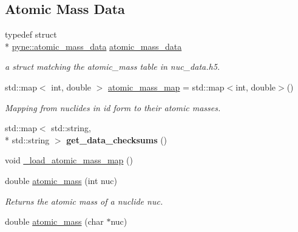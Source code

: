\subsection*{Atomic Mass Data}
\begin{DoxyCompactItemize}
\item 
\hypertarget{namespacepyne_a4d33f77321c43a895b32c56b0c4b9256}{typedef struct \\*
\hyperlink{structpyne_1_1atomic__mass__data}{pyne\-::atomic\-\_\-mass\-\_\-data} \hyperlink{namespacepyne_a4d33f77321c43a895b32c56b0c4b9256}{atomic\-\_\-mass\-\_\-data}}\label{namespacepyne_a4d33f77321c43a895b32c56b0c4b9256}

\begin{DoxyCompactList}\small\item\em a struct matching the atomic\-\_\-mass table in nuc\-\_\-data.\-h5. \end{DoxyCompactList}\item 
\hypertarget{namespacepyne_ad57b70e4dd814b1efc458ff58641bcef}{std\-::map$<$ int, double $>$ \hyperlink{namespacepyne_ad57b70e4dd814b1efc458ff58641bcef}{atomic\-\_\-mass\-\_\-map} = std\-::map$<$int, double$>$()}\label{namespacepyne_ad57b70e4dd814b1efc458ff58641bcef}

\begin{DoxyCompactList}\small\item\em Mapping from nuclides in id form to their atomic masses. \end{DoxyCompactList}\item 
\hypertarget{namespacepyne_a7ffac869653ccaac71a565704630ae43}{std\-::map$<$ std\-::string, \\*
std\-::string $>$ {\bfseries get\-\_\-data\-\_\-checksums} ()}\label{namespacepyne_a7ffac869653ccaac71a565704630ae43}

\item 
void \hyperlink{namespacepyne_afc84ecca5a23b416bd3bf42b0756e68e}{\-\_\-load\-\_\-atomic\-\_\-mass\-\_\-map} ()
\item 
double \hyperlink{namespacepyne_aaab79c2417fc60c1a248dd702403befb}{atomic\-\_\-mass} (int nuc)
\begin{DoxyCompactList}\small\item\em Returns the atomic mass of a nuclide {\itshape nuc}. \end{DoxyCompactList}\item 
\hypertarget{namespacepyne_a070a35bbdb0217ff8c4b222572912f87}{double \hyperlink{namespacepyne_a070a35bbdb0217ff8c4b222572912f87}{atomic\-\_\-mass} (char $\ast$nuc)}\label{namespacepyne_a070a35bbdb0217ff8c4b222572912f87}


\end{DoxyCompactItemize}
